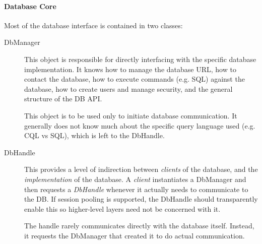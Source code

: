      \paragraph{Database Core} Most of the database interface is contained in two classes:
     \begin{description}
       \item[DbManager] This object is responsible for directly interfacing with the
         specific database implementation.  It knows how to manage the
         database URL, how to contact the database, how to execute commands (e.g. SQL)
         against the database, how to create users and manage security, and the
         general structure of the DB API.

         This object is to be used only to initiate database communication. It generally does not
         know much about the specific query language used (e.g. CQL vs SQL), which is left to the
         DbHandle.
       \item[DbHandle] This provides a level of indirection between {\em clients} of the
         database, and the {\em implementation} of the database.  A {\em client} 
         instantiates a DbManager and then requests a {\em DbHandle} whenever it actually
         needs to communicate to the DB.  If session pooling is supported, the DbHandle should
         transparently enable this so higher-level layers need not be concerned with it.

         The handle rarely communicates directly with the database itself.  Instead, it 
         requests the DbManager that created it to do actual communication.
     \end{description}

